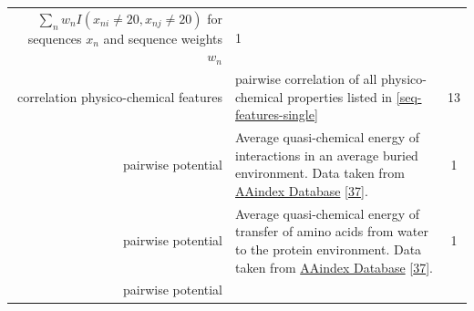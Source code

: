 \documentclass[12pt,a4paper,twoside]{book}
\theoremstyle{definition}
\theoremstyle{definition}
\theoremstyle{remark}
\begin{document}
\begin{longtable}[]{@{}rlc@{}}
\begin{minipage}[t]{0.50\columnwidth}
\(\sum_n w_n I(x_{ni} \! \neq \! 20, x_{nj} \! \neq \! 20)\) for
sequences \(x_n\) and sequence weights \(w_n\)\strut
\end{minipage} & \begin{minipage}[t]{0.18\columnwidth}\centering\strut
1\strut
\end{minipage}\tabularnewline
\begin{minipage}[t]{0.23\columnwidth}\raggedleft\strut
correlation physico-chemical features\strut
\end{minipage} & \begin{minipage}[t]{0.50\columnwidth}\raggedright\strut
pairwise correlation of all physico-chemical properties listed in
\ref{seq-features-single}\strut
\end{minipage} & \begin{minipage}[t]{0.18\columnwidth}\centering\strut
13\strut
\end{minipage}\tabularnewline
\begin{minipage}[t]{0.23\columnwidth}\raggedleft\strut
pairwise potential\strut
\end{minipage} & \begin{minipage}[t]{0.50\columnwidth}\raggedright\strut
Average quasi-chemical energy of interactions in an average buried
environment. Data taken from
\href{http://www.genome.jp/dbget-bin/www_bget?aaindex:MIYS990107}{AAindex
Database} {[}\protect\hyperlink{ref-Kawashima2008}{37}{]}.\strut
\end{minipage} & \begin{minipage}[t]{0.18\columnwidth}\centering\strut
1\strut
\end{minipage}\tabularnewline
\begin{minipage}[t]{0.23\columnwidth}\raggedleft\strut
pairwise potential\strut
\end{minipage} & \begin{minipage}[t]{0.50\columnwidth}\raggedright\strut
Average quasi-chemical energy of transfer of amino acids from water to
the protein environment. Data taken from
\href{http://www.genome.jp/dbget-bin/www_bget?aaindex:MIYS990106}{AAindex
Database} {[}\protect\hyperlink{ref-Kawashima2008}{37}{]}.\strut
\end{minipage} & \begin{minipage}[t]{0.18\columnwidth}\centering\strut
1\strut
\end{minipage}\tabularnewline
\begin{minipage}[t]{0.23\columnwidth}\raggedleft\strut
pairwise potential\strut
\end{minipage} & \begin{minipage}[t]{0.50\columnwidth}\raggedright\strut

\end{minipage}
\end{longtable}
\end{document}
